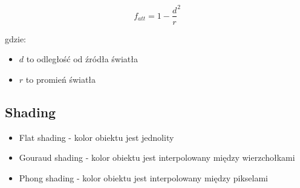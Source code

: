 \documentclass{../notatki}
\begin{document}
$$
f_{att} = 1 - \frac{d}{r}^2
$$

gdzie:

\begin{itemize}
    \item $d$ to odległość od źródła światła
    \item $r$ to promień światła
\end{itemize}

\subsection{Shading}

\begin{itemize}
    \item Flat shading - kolor obiektu jest jednolity
    \item Gouraud shading - kolor obiektu jest interpolowany między wierzchołkami
    \item Phong shading - kolor obiektu jest interpolowany między pikselami
\end{itemize}
\end{document}
